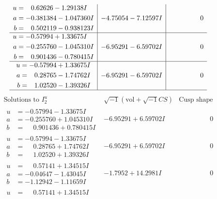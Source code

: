 \documentclass[1p]{elsarticle_modified}
\theoremstyle{definition}
\newcommand{\I}{\sqrt{-1}}
\begin{document}
$$\begin{array}{c|c|c}
\begin{aligned}
u &= \phantom{-}0.62626 - 1.29138 I \\
a &= -0.381384 - 1.047360 I \\
b &= \phantom{-}0.502119 - 0.938123 I\end{aligned}
 & -4.75054 - 7.12597 I & \phantom{-0.000000 } 0 \\ \hline\begin{aligned}
u &= -0.57994 + 1.33675 I \\
a &= -0.255760 - 1.045310 I \\
b &= \phantom{-}0.901436 - 0.780415 I\end{aligned}
 & -6.95291 - 6.59702 I & \phantom{-0.000000 } 0 \\ \hline\begin{aligned}
u &= -0.57994 + 1.33675 I \\
a &= \phantom{-}0.28765 - 1.74762 I \\
b &= \phantom{-}1.02520 - 1.39326 I\end{aligned}
 & -6.95291 - 6.59702 I & \phantom{-0.000000 } 0\\
 \hline 
 \end{array}$$\newpage$$\begin{array}{c|c|c}  
\text{Solutions to }I^u_{2}& \I (\text{vol} + \sqrt{-1}CS) & \text{Cusp shape}\\
 \hline 
\begin{aligned}
u &= -0.57994 - 1.33675 I \\
a &= -0.255760 + 1.045310 I \\
b &= \phantom{-}0.901436 + 0.780415 I\end{aligned}
 & -6.95291 + 6.59702 I & \phantom{-0.000000 } 0 \\ \hline\begin{aligned}
u &= -0.57994 - 1.33675 I \\
a &= \phantom{-}0.28765 + 1.74762 I \\
b &= \phantom{-}1.02520 + 1.39326 I\end{aligned}
 & -6.95291 + 6.59702 I & \phantom{-0.000000 } 0 \\ \hline\begin{aligned}
u &= \phantom{-}0.57141 + 1.34515 I \\
a &= -0.04647 - 1.43045 I \\
b &= -1.12942 - 1.11659 I\end{aligned}
 & -1.7952 + 14.2981 I & \phantom{-0.000000 } 0 \\ \hline\begin{aligned}
u &= \phantom{-}0.57141 + 1.34515 I \\

\end{aligned}
\end{array}$$
\end{document}
